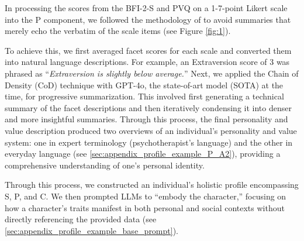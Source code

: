 In processing the scores from the BFI-2-S and PVQ on a 1-7-point Likert scale into the P component, we followed the methodology of \citet{serapio-garcia_personality_2023} to avoid summaries that merely echo the verbatim of the scale items (see Figure \ref{fig:1}). 

To achieve this, we first averaged facet scores for each scale and converted them into natural language descriptions. For example, an Extraversion score of 3 was phrased as ``\textit{Extraversion is slightly below average.}'' Next, we applied the Chain of Density (CoD) technique \citep{adams_sparse_2023} with GPT-4o, the state-of-art model (SOTA) at the time, for progressive summarization. This involved first generating a technical summary of the facet descriptions and then iteratively condensing it into denser and more insightful summaries. Through this process, the final personality and value description produced two overviews of an individual's personality and value system: one in expert terminology (psychotherapist's language) and the other in everyday language (see \ref{sec:appendix_profile_example_P_A2}), providing a comprehensive understanding of one's personal identity.

Through this process, we constructed an individual’s holistic profile encompassing S, P, and C. We then prompted LLMs to ``embody the character,'' focusing on how a character’s traits manifest in both personal and social contexts without directly referencing the provided data (see \ref{sec:appendix_profile_example_base_prompt}). 


